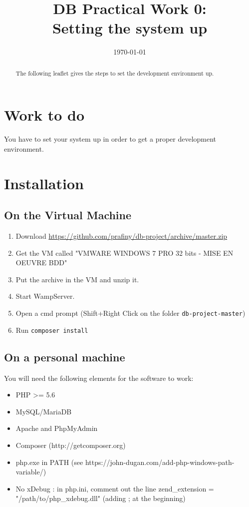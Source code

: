 \documentclass[twoside,a4paper,12pt]{article}
\title{DB Practical Work 0:\\Setting the system up}
\date{\today}
\begin{document}
\maketitle

\begin{abstract}
  The following leaflet gives the steps to set the development environment up.
\end{abstract}

\tableofcontents

\clearpage

\section{Work to do}
You have to set your system up in order to get a proper development environment.

\section{Installation}

\subsection{On the Virtual Machine}
\begin{enumerate}
\item Download \url{https://github.com/prafiny/db-project/archive/master.zip}
\item Get the VM called "VMWARE WINDOWS 7 PRO 32 bits - MISE EN OEUVRE BDD"
\item Put the archive in the VM and unzip it.
\item Start WampServer.
\item Open a cmd prompt (Shift+Right Click on the folder \texttt{db-project-master})
\item Run \texttt{composer install}
\end{enumerate}

\subsection{On a personal machine}
You will need the following elements for the software to work:
\begin{itemize}
\item PHP >= 5.6
\item MySQL/MariaDB
\item Apache and PhpMyAdmin
\item Composer (http://getcomposer.org)
\item php.exe in PATH (see https://john-dugan.com/add-php-windows-path-variable/)
\item No xDebug : in php.ini, comment out the line zend\_extension = "/path/to/php\_xdebug.dll" (adding ; at the beginning)
\end{itemize}
\end{document}

